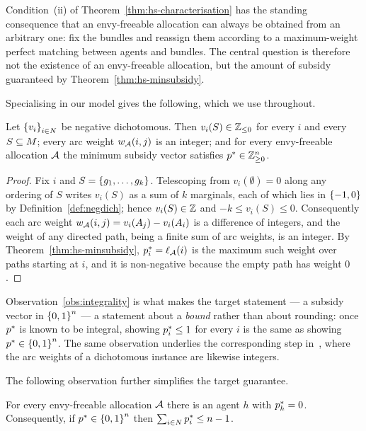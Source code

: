 Condition~(ii) of Theorem~\ref{thm:hs-characterisation} has the standing consequence
that an envy-freeable allocation can always be obtained from an arbitrary
one: fix the bundles and reassign them according to a maximum-weight perfect
matching between agents and bundles. The central question is therefore not the existence of an envy-freeable allocation, but the amount of subsidy guaranteed by Theorem~\ref{thm:hs-minsubsidy}.

Specialising in our model gives the following, which we use throughout.

\begin{observation}[Integrality]
\label{obs:integrality}
Let $\left\{v_i\right\}_{i \in N}$ be negative dichotomous. Then $v_i(S) \in
\mathbb{Z}_{\le 0}$ for every $i$ and every $S \subseteq M$; every arc weight
$w_{\mathcal{A}}(i,j)$ is an integer; and for every envy-freeable allocation
$\mathcal{A}$ the minimum subsidy vector satisfies $p^{*} \in \mathbb{Z}^n_{\ge 0}$.
\end{observation}

\begin{proof}
Fix $i$ and $S = \left\{g_1,\dots,g_k\right\}$. Telescoping from $v_i(\emptyset) = 0$
along any ordering of $S$ writes $v_i(S)$ as a sum of $k$ marginals, each of
which lies in $\left\{-1,0\right\}$ by Definition~\ref{def:negdich}; hence $v_i(S) \in \mathbb{Z}$ and
$-k \le v_i(S) \le 0$. Consequently each arc weight
$w_{\mathcal{A}}(i,j) = v_i(A_{j}) - v_i(A_{i})$ is a difference of
integers, and the weight of any directed path, being a finite sum of arc
weights, is an integer. By Theorem~\ref{thm:hs-minsubsidy},
$p^{*}_i = \ell_{\mathcal{A}}(i)$ is the maximum such weight over paths
starting at $i$, and it is non-negative because the empty path has weight $0$.
\end{proof}

Observation~\ref{obs:integrality} is what makes the target statement --- a subsidy vector in
$\left\{0,1\right\}^n$ --- a statement about a \emph{bound} rather than about rounding:
once $p^{*}$ is known to be integral, showing $p^{*}_i \le 1$ for
every $i$ is the same as showing $p^{*} \in \left\{0,1\right\}^n$. The same
observation underlies the corresponding step in~\cite{BKNS22}, where the arc weights of a dichotomous instance are likewise integers.

The following observation further simplifies the target guarantee.

\begin{proposition}
\label{prop:zero-coordinate}
For every envy-freeable allocation $\mathcal{A}$ there is an agent $h$ with
$p^{*}_h = 0$. Consequently, if $p^{*} \in \left\{0,1\right\}^n$ then
$\sum_{i \in N} p^{*}_i \le n-1$.
\end{proposition}

